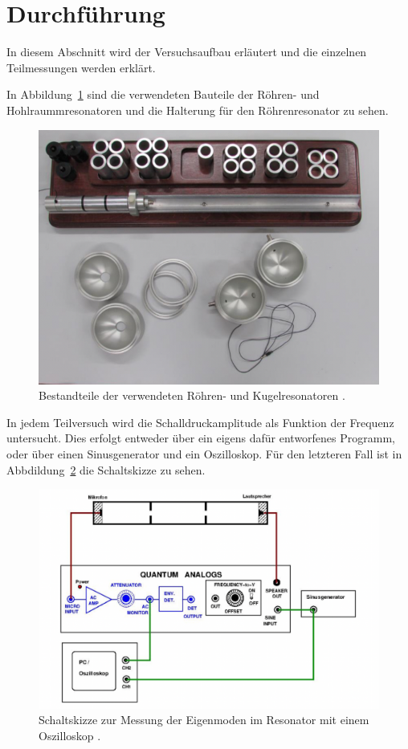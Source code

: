 \section{Durchführung}
In diesem Abschnitt wird der Versuchsaufbau erläutert und die einzelnen Teilmessungen werden erklärt.

In Abbildung~\ref{fig:resonatoren} sind die verwendeten Bauteile der Röhren- und Hohlraummresonatoren und die Halterung für den Röhrenresonator zu sehen.

\begin{figure}[H]
  \centering
  \includegraphics[width=12cm, keepaspectratio]{resonatoren.png}
  \caption{Bestandteile der verwendeten Röhren- und Kugelresonatoren \cite{anleitung}.}
  \label{fig:resonatoren}
\end{figure}

In jedem Teilversuch wird die Schalldruckamplitude als Funktion der Frequenz untersucht. Dies erfolgt entweder über ein eigens dafür entworfenes Programm, oder über einen Sinusgenerator und ein Oszilloskop. Für den letzteren Fall ist in Abbdildung~\ref{fig:schaltskizze} die Schaltskizze zu sehen.

\begin{figure}[H]
  \centering
  \includegraphics[width=12cm,keepaspectratio]{schaltskizze.png}
  \caption{Schaltskizze zur Messung der Eigenmoden im Resonator mit einem Oszilloskop \cite{anleitung}.}
  \label{fig:schaltskizze}
\end{figure}

